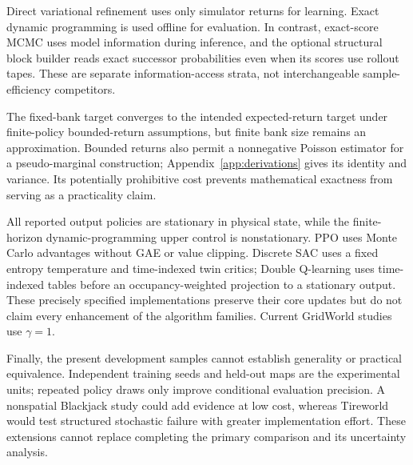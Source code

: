 
Direct variational refinement uses only simulator returns for learning.
Exact dynamic programming is used offline for evaluation. In contrast,
exact-score MCMC uses model information during inference, and the optional
structural block builder reads exact successor probabilities even when its
scores use rollout tapes. These are separate information-access strata,
not interchangeable sample-efficiency competitors.

The fixed-bank target converges to the intended expected-return target
under finite-policy bounded-return assumptions, but finite bank size remains
an approximation. Bounded returns also permit a nonnegative Poisson
estimator for a pseudo-marginal construction; Appendix~\ref{app:derivations}
gives its identity and variance. Its potentially prohibitive cost prevents
mathematical exactness from serving as a practicality claim.

All reported output policies are stationary in physical state, while the
finite-horizon dynamic-programming upper control is nonstationary.
PPO uses Monte Carlo advantages without GAE or value clipping. Discrete SAC
uses a fixed entropy temperature and time-indexed twin critics; Double
Q-learning uses time-indexed tables before an occupancy-weighted projection
to a stationary output. These precisely specified implementations preserve
their core updates but do not claim every enhancement of the algorithm
families. Current GridWorld studies use $\gamma=1$.

Finally, the present development samples cannot establish generality or
practical equivalence. Independent training seeds and held-out maps are the
experimental units; repeated policy draws only improve conditional
evaluation precision. A nonspatial Blackjack study could add evidence at
low cost, whereas Tireworld would test structured stochastic failure with
greater implementation effort. These extensions cannot replace completing
the primary comparison and its uncertainty analysis.
